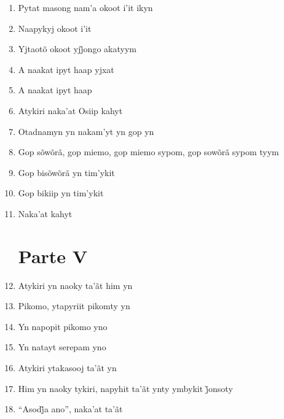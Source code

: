 \begin{enumerate}
 \item Pytat masong nam'a okoot i'it ikyn

 \item Naapykyj okoot i'it

 \item Yjtaotõ okoot yjj̃ongo akatyym

 \item A naakat ipyt haap yjxat

 \item A naakat ipyt haap

 \begin{center}\end{center}

 \item Atykiri naka'at Osiip kahyt

 \item Otadnamyn yn nakam'yt yn gop yn

 \item Gop sõwõrã, gop miemo, gop miemo sypom, gop sowõrã sypom tyym

 \item Gop bisõwõrã yn tim'ykit

 \item Gop bikiip yn tim'ykit

 \item Naka'at kahyt

 \section{Parte V}

 \item Atykiri yn naoky ta'ãt him yn

 \item Pikomo, ytapyriit pikomty yn

 \item Yn napopit pikomo yno

 \item Yn natayt serepam yno

 \begin{center}\end{center}

 \item Atykiri ytakasooj ta'ãt yn

 \item Him yn naoky tykiri, napyhit ta’ãt ynty ymbykit j̃onsoty

 \item ``Asodj̃a ano'', naka’at ta’ãt


\end{enumerate}
